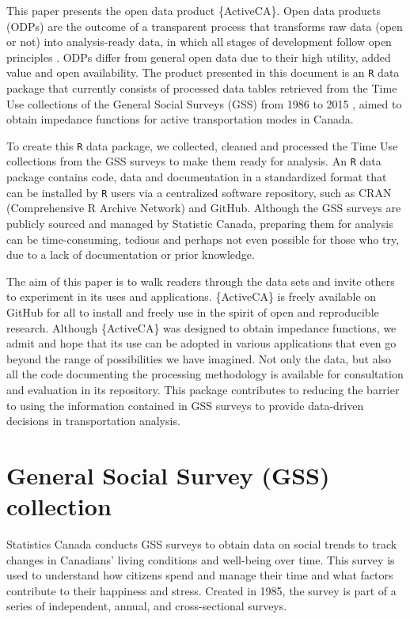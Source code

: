 \documentclass[Royal,times,sageh]{sagej}
\begin{document}
This paper presents the open data product \{ActiveCA\}. Open data
products (ODPs) are the outcome of a transparent process that transforms
raw data (open or not) into analysis-ready data, in which all stages of
development follow open principles \citep{arribas-bel2021}. ODPs differ
from general open data due to their high utility, added value and open
availability. The product presented in this document is an \texttt{R}
data package that currently consists of processed data tables retrieved
from the Time Use collections of the General Social Surveys (GSS) from
1986 to 2015 \citep{statisticscanada2024}, aimed to obtain impedance
functions for active transportation modes in Canada.

To create this \texttt{R} data package, we collected, cleaned and
processed the Time Use collections from the GSS surveys to make them
ready for analysis. An \texttt{R} data package contains code, data and
documentation in a standardized format that can be installed by
\texttt{R} users via a centralized software repository, such as CRAN
(Comprehensive R Archive Network) and GitHub. Although the GSS surveys
are publicly sourced and managed by Statistic Canada, preparing them for
analysis can be time-consuming, tedious and perhaps not even possible
for those who try, due to a lack of documentation or prior knowledge.

The aim of this paper is to walk readers through the data sets and
invite others to experiment in its uses and applications. \{ActiveCA\}
is freely available on GitHub for all to install and freely use in the
spirit of open and reproducible research. Although \{ActiveCA\} was
designed to obtain impedance functions, we admit and hope that its use
can be adopted in various applications that even go beyond the range of
possibilities we have imagined. Not only the data, but also all the code
documenting the processing methodology is available for consultation and
evaluation in its repository. This package contributes to reducing the
barrier to using the information contained in GSS surveys to provide
data-driven decisions in transportation analysis.

\hypertarget{general-social-survey-gss-collection}{%
\section{General Social Survey (GSS)
collection}\label{general-social-survey-gss-collection}}

Statistics Canada \citeyearpar{statisticscanada2024} conducts GSS
surveys to obtain data on social trends to track changes in Canadians'
living conditions and well-being over time. This survey is used to
understand how citizens spend and manage their time and what factors
contribute to their happiness and stress. Created in 1985, the survey is
part of a series of independent, annual, and cross-sectional surveys.
\end{document}
